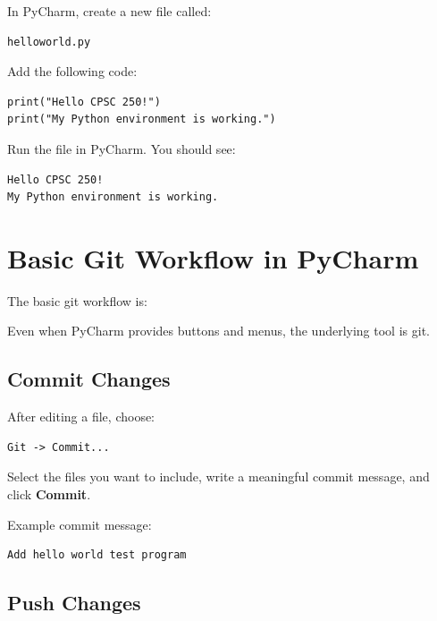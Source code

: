 \documentclass[11pt]{article}
\begin{document}
In PyCharm, create a new file called:

\begin{lstlisting}[style=terminal]
helloworld.py
\end{lstlisting}

Add the following code:

\begin{lstlisting}[style=python]
print("Hello CPSC 250!")
print("My Python environment is working.")
\end{lstlisting}

Run the file in PyCharm. You should see:

\begin{lstlisting}[style=terminal]
Hello CPSC 250!
My Python environment is working.
\end{lstlisting}

\section{Basic Git Workflow in PyCharm}

The basic git workflow is:

\begin{center}
\end{center}

Even when PyCharm provides buttons and menus, the underlying tool is git.

\subsection*{Commit Changes}

After editing a file, choose:

\begin{lstlisting}[style=terminal]
Git -> Commit...
\end{lstlisting}

Select the files you want to include, write a meaningful commit message, and click \textbf{Commit}.

Example commit message:

\begin{lstlisting}[style=terminal]
Add hello world test program
\end{lstlisting}

\subsection*{Push Changes}
\end{document}
